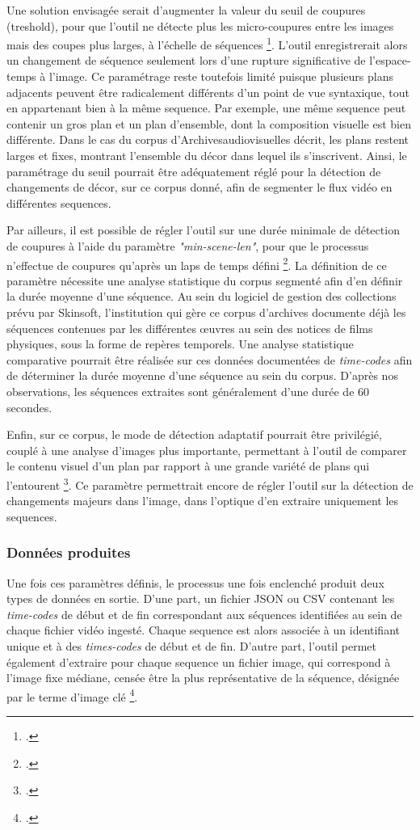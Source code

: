 Une solution envisagée serait d'augmenter la valeur du seuil de coupures (treshold), pour que l'outil ne détecte plus les micro-coupures entre les images mais des coupes plus larges, à l'échelle de séquences \footcite{zotero-item-708}. L'outil enregistrerait alors un changement de séquence seulement lors d'une rupture significative de l’espace-temps à l'image. Ce paramétrage reste toutefois limité puisque plusieurs plans adjacents peuvent être radicalement différents d’un point de vue syntaxique, tout en appartenant bien à la même \gls{sequence}. Par exemple, une même \gls{sequence} peut contenir un gros plan et un plan d'ensemble, dont la composition visuelle est bien différente. Dans le cas du corpus d'\gls{Archivesaudiovisuelles} décrit, les plans restent larges et fixes, montrant l'ensemble du décor dans lequel ils s'inscrivent. Ainsi, le paramétrage du seuil pourrait être adéquatement réglé pour la détection de changements de décor, sur ce corpus donné, afin de segmenter le flux vidéo en différentes \gls{sequence}s.  

Par ailleurs, il est possible de régler l’outil sur une durée minimale de détection de coupures à l’aide du paramètre \textit{"min-scene-len"}, pour que le processus n’effectue de coupures qu’après un laps de temps défini \footcite{zotero-item-708}. La définition de ce paramètre nécessite une analyse statistique du corpus segmenté afin d’en définir la durée moyenne d'une séquence. Au sein du logiciel de gestion des collections prévu par Skinsoft, l’institution qui gère ce corpus d’archives documente déjà les séquences contenues par les différentes œuvres au sein des notices de films physiques, sous la forme de repères temporels. Une analyse statistique comparative pourrait être réalisée sur ces données documentées de \textit{time-codes} afin de déterminer la durée moyenne d'une séquence au sein du corpus. D'après nos observations, les séquences extraites sont généralement d'une durée de 60 secondes.

Enfin, sur ce corpus, le mode de détection adaptatif pourrait être privilégié, couplé à une analyse d'images plus importante, permettant à l’outil de comparer le contenu visuel d’un plan par rapport à une grande variété de plans qui l’entourent \footcite{zotero-item-708}. Ce paramètre permettrait encore de régler l’outil sur la détection de changements majeurs dans l'image, dans l'optique d'en extraire uniquement les \gls{sequence}s.  

\subsubsection{Données produites}
Une fois ces paramètres définis, le processus une fois enclenché produit deux types de données en sortie. D'une part, un fichier JSON ou CSV contenant les \textit{time-codes} de début et de fin correspondant aux séquences identifiées au sein de chaque fichier vidéo ingesté. Chaque \gls{sequence} est alors associée à un identifiant unique et à des \textit{times-codes} de début et de fin. D'autre part, l'outil permet également d'extraire pour chaque \gls{sequence} un fichier image, qui correspond à l'image fixe médiane, censée être la plus représentative de la séquence, désignée par le terme d'image clé \footcite{zotero-item-708}. 

